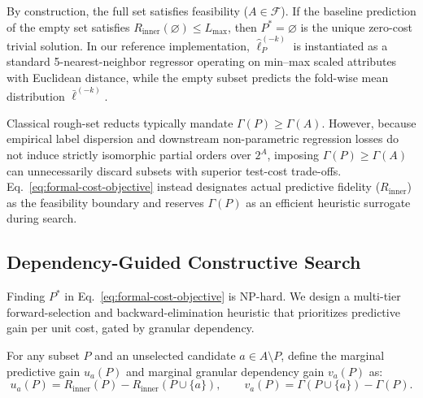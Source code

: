 By construction, the full set satisfies feasibility ($A \in \mathcal{F}$). If the baseline prediction of the empty set satisfies $R_{\mathrm{inner}}(\varnothing) \le L_{\max}$, then $P^* = \varnothing$ is the unique zero-cost trivial solution. In our reference implementation, $\widehat{\boldsymbol{\ell}}^{(-k)}_P$ is instantiated as a standard 5-nearest-neighbor regressor operating on min--max scaled attributes with Euclidean distance, while the empty subset predicts the fold-wise mean distribution $\bar{\boldsymbol{\ell}}^{(-k)}$.

\begin{remark}
	Classical rough-set reducts typically mandate $\Gamma(P) \ge \Gamma(A)$. However, because empirical label dispersion and downstream non-parametric regression losses do not induce strictly isomorphic partial orders over $2^A$, imposing $\Gamma(P) \ge \Gamma(A)$ can unnecessarily discard subsets with superior test-cost trade-offs. Eq.~\eqref{eq:formal-cost-objective} instead designates actual predictive fidelity ($R_{\mathrm{inner}}$) as the feasibility boundary and reserves $\Gamma(P)$ as an efficient heuristic surrogate during search.
\end{remark}

\subsection{Dependency-Guided Constructive Search}
\label{sub-sec:dependency}
Finding $P^*$ in Eq.~\eqref{eq:formal-cost-objective} is NP-hard. We design a multi-tier forward-selection and backward-elimination heuristic that prioritizes predictive gain per unit cost, gated by granular dependency.

For any subset $P$ and an unselected candidate $a \in A \setminus P$, define the marginal predictive gain $u_a(P)$ and marginal granular dependency gain $v_a(P)$ as:
\begin{equation}
	u_a(P) = R_{\mathrm{inner}}(P) - R_{\mathrm{inner}}(P \cup \{a\}), \qquad
	v_a(P) = \Gamma(P \cup \{a\}) - \Gamma(P).
	\label{eq:marginal-gains}
\end{equation}


